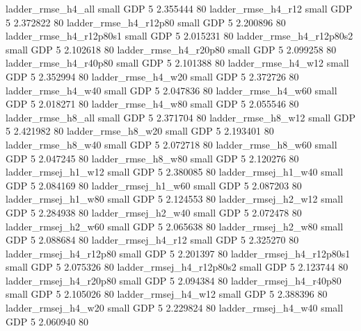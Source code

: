       ladder_rmse_h4_all      small      GDP                 5 2.355444 80
      ladder_rmse_h4_r12      small      GDP                 5 2.372822 80
   ladder_rmse_h4_r12p80      small      GDP                 5 2.200896 80
 ladder_rmse_h4_r12p80s1      small      GDP                 5 2.015231 80
 ladder_rmse_h4_r12p80s2      small      GDP                 5 2.102618 80
   ladder_rmse_h4_r20p80      small      GDP                 5 2.099258 80
   ladder_rmse_h4_r40p80      small      GDP                 5 2.101388 80
      ladder_rmse_h4_w12      small      GDP                 5 2.352994 80
      ladder_rmse_h4_w20      small      GDP                 5 2.372726 80
      ladder_rmse_h4_w40      small      GDP                 5 2.047836 80
      ladder_rmse_h4_w60      small      GDP                 5 2.018271 80
      ladder_rmse_h4_w80      small      GDP                 5 2.055546 80
      ladder_rmse_h8_all      small      GDP                 5 2.371704 80
      ladder_rmse_h8_w12      small      GDP                 5 2.421982 80
      ladder_rmse_h8_w20      small      GDP                 5 2.193401 80
      ladder_rmse_h8_w40      small      GDP                 5 2.072718 80
      ladder_rmse_h8_w60      small      GDP                 5 2.047245 80
      ladder_rmse_h8_w80      small      GDP                 5 2.120276 80
     ladder_rmsej_h1_w12      small      GDP                 5 2.380085 80
     ladder_rmsej_h1_w40      small      GDP                 5 2.084169 80
     ladder_rmsej_h1_w60      small      GDP                 5 2.087203 80
     ladder_rmsej_h1_w80      small      GDP                 5 2.124553 80
     ladder_rmsej_h2_w12      small      GDP                 5 2.284938 80
     ladder_rmsej_h2_w40      small      GDP                 5 2.072478 80
     ladder_rmsej_h2_w60      small      GDP                 5 2.065638 80
     ladder_rmsej_h2_w80      small      GDP                 5 2.088684 80
     ladder_rmsej_h4_r12      small      GDP                 5 2.325270 80
  ladder_rmsej_h4_r12p80      small      GDP                 5 2.201397 80
ladder_rmsej_h4_r12p80s1      small      GDP                 5 2.075326 80
ladder_rmsej_h4_r12p80s2      small      GDP                 5 2.123744 80
  ladder_rmsej_h4_r20p80      small      GDP                 5 2.094384 80
  ladder_rmsej_h4_r40p80      small      GDP                 5 2.105026 80
     ladder_rmsej_h4_w12      small      GDP                 5 2.388396 80
     ladder_rmsej_h4_w20      small      GDP                 5 2.229824 80
     ladder_rmsej_h4_w40      small      GDP                 5 2.060940 80
